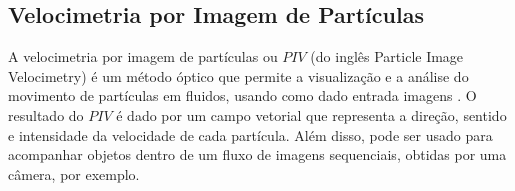 \subsection{Velocimetria por Imagem de Partículas}

A velocimetria por imagem de partículas ou $PIV$ (do inglês Particle Image Velocimetry) 
é um método óptico que permite a visualização e a análise do movimento de partículas em fluidos, 
usando como dado entrada imagens \cite{Bastiaans}.
O resultado do $PIV$ é dado por um campo vetorial que representa a direção, sentido e intensidade da velocidade de cada 
partícula. Além disso, pode ser usado para acompanhar objetos dentro de um fluxo de imagens sequenciais, 
obtidas por uma câmera, por exemplo.

